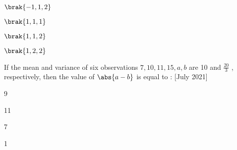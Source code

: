  \begin{enumerate}
     \begin{multicols}{2}
     \item $\brak{-1,1,2}$
     \item $\brak{1,1,1}$
     \item $\brak{1,1,2}$
     \item $\brak{1,2,2}$
     \end{multicols}
 \end{enumerate}
 \item If the mean and variance of six observations $7, 10, 11, 15, a, b $ are 10 and $\frac{20}{3}$
 , respectively, then the value of $\abs{a -
 b}$ is equal to : \hfill[July 2021]
 \begin{enumerate}
 \begin{multicols}{2}  
     \item 9
     \item 11
     \item 7
     \item 1
 \end{multicols}
 \end{enumerate}
